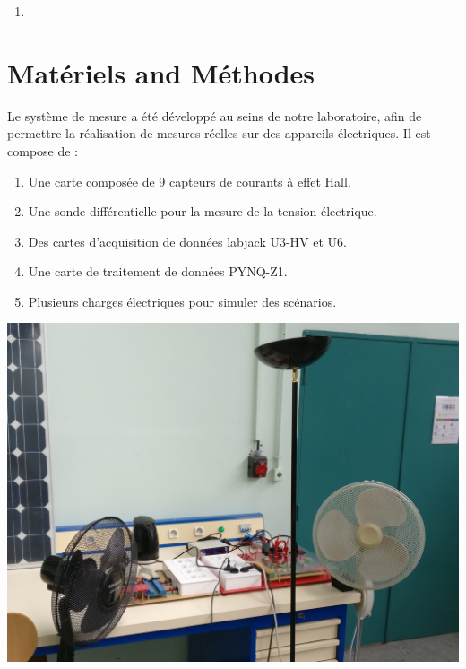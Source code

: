 \documentclass[a0,portrait]{a0poster}
\begin{document}
\begin{multicols}{2}
\begin{enumerate}
\item 
\end{enumerate}


\section*{Matériels and Méthodes}
Le système de mesure a été développé au seins de notre laboratoire, afin de permettre la réalisation de mesures réelles sur des appareils électriques. Il est compose de :
\begin{enumerate}
\item Une carte composée de 9 capteurs de courants à effet Hall.
\item Une sonde différentielle pour la mesure de la tension électrique.
\item Des cartes d'acquisition de données labjack U3-HV et U6.
\item Une carte de traitement de données PYNQ-Z1.
\item Plusieurs charges électriques pour simuler des scénarios.
\end{enumerate}

\begin{center}\vspace{1cm}
\includegraphics[width=1\linewidth]{systeme_mesure.jpg}
\end{center}\vspace{1cm}


\end{multicols}
\end{document}
